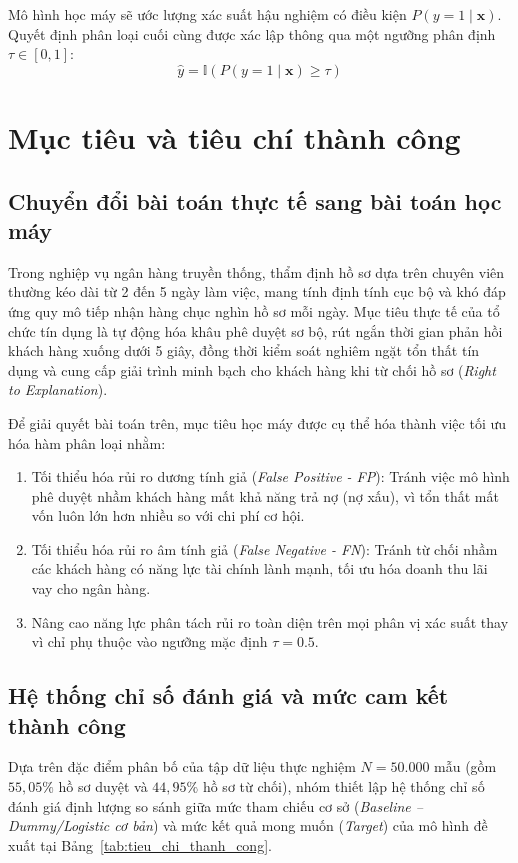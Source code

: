 \documentclass[12pt,a4paper,oneside]{report}
\begin{document}
Mô hình học máy sẽ ước lượng xác suất hậu nghiệm có điều kiện $P(y = 1 \mid \mathbf{x})$. Quyết định phân loại cuối cùng được xác lập thông qua một ngưỡng phân định $\tau \in [0, 1]$:
\begin{equation}
    \hat{y} = \mathbb{I}\left(P(y = 1 \mid \mathbf{x}) \ge \tau\right)
\end{equation}


\section{Mục tiêu và tiêu chí thành công}

\subsection{Chuyển đổi bài toán thực tế sang bài toán học máy}
Trong nghiệp vụ ngân hàng truyền thống, thẩm định hồ sơ dựa trên chuyên viên thường kéo dài từ 2 đến 5 ngày làm việc, mang tính định tính cục bộ và khó đáp ứng quy mô tiếp nhận hàng chục nghìn hồ sơ mỗi ngày. Mục tiêu thực tế của tổ chức tín dụng là tự động hóa khâu phê duyệt sơ bộ, rút ngắn thời gian phản hồi khách hàng xuống dưới 5 giây, đồng thời kiểm soát nghiêm ngặt tổn thất tín dụng và cung cấp giải trình minh bạch cho khách hàng khi từ chối hồ sơ (\textit{Right to Explanation}).

Để giải quyết bài toán trên, mục tiêu học máy được cụ thể hóa thành việc tối ưu hóa hàm phân loại nhằm:
\begin{enumerate}
    \item Tối thiểu hóa rủi ro dương tính giả (\textit{False Positive - FP}): Tránh việc mô hình phê duyệt nhầm khách hàng mất khả năng trả nợ (nợ xấu), vì tổn thất mất vốn luôn lớn hơn nhiều so với chi phí cơ hội.
    \item Tối thiểu hóa rủi ro âm tính giả (\textit{False Negative - FN}): Tránh từ chối nhầm các khách hàng có năng lực tài chính lành mạnh, tối ưu hóa doanh thu lãi vay cho ngân hàng.
    \item Nâng cao năng lực phân tách rủi ro toàn diện trên mọi phân vị xác suất thay vì chỉ phụ thuộc vào ngưỡng mặc định $\tau = 0.5$.
\end{enumerate}

\subsection{Hệ thống chỉ số đánh giá và mức cam kết thành công}
Dựa trên đặc điểm phân bố của tập dữ liệu thực nghiệm $N = 50.000$ mẫu (gồm $55,05\%$ hồ sơ duyệt và $44,95\%$ hồ sơ từ chối), nhóm thiết lập hệ thống chỉ số đánh giá định lượng so sánh giữa mức tham chiếu cơ sở (\textit{Baseline -- Dummy/Logistic cơ bản}) và mức kết quả mong muốn (\textit{Target}) của mô hình đề xuất tại Bảng~\ref{tab:tieu_chi_thanh_cong}.
\end{document}
